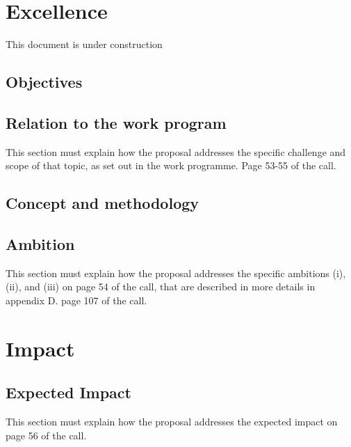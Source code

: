 \documentclass[12pt]{book}
\begin{document}
\tableofcontents
\chapter{Excellence}

{\Huge \color{red} This document is under construction}



\section{Objectives}



\section{Relation to the work program}

{\color{red} This section must explain how the proposal addresses the
  specific challenge and scope of that topic, as set out in the work
  programme. Page 53-55 of the call.}



\section{Concept and methodology}



\section{Ambition}

{\color{red} This section must explain how the proposal addresses the
  specific ambitions (i), (ii), and (iii) on page 54 of the call, that are
  described in more details in appendix D. page 107 of the call.}



\chapter{Impact}

\section{Expected Impact}

{\color{red} This section must explain how the proposal addresses the
  expected impact on page 56 of the call.}
\end{document}
